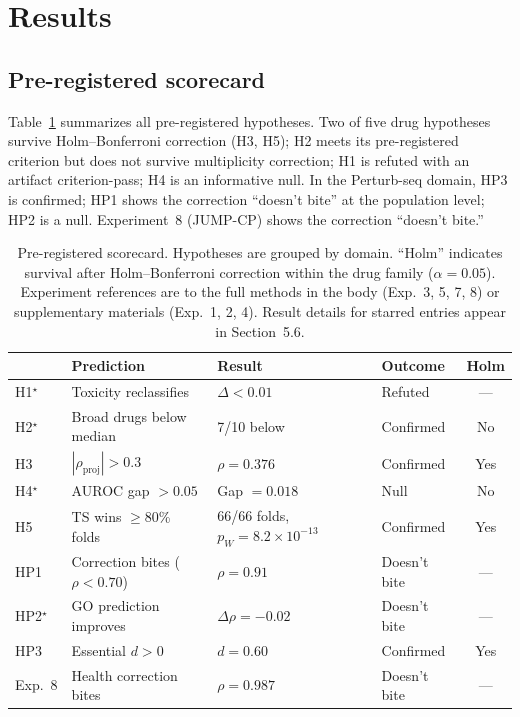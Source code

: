 \documentclass{article}
\begin{document}
\section{Results}

\subsection{Pre-registered scorecard}

Table~\ref{tab:scorecard} summarizes all pre-registered hypotheses.
Two of five drug hypotheses survive Holm--Bonferroni correction (H3, H5);
H2 meets its pre-registered criterion but does not survive multiplicity
correction; H1 is refuted with an artifact criterion-pass; H4 is an
informative null.
In the Perturb-seq domain, HP3 is confirmed; HP1 shows the correction
``doesn't bite'' at the population level; HP2 is a null. Experiment~8
(JUMP-CP) shows the correction ``doesn't bite.''

\begin{table}[t]
\centering
\caption{Pre-registered scorecard. Hypotheses are grouped by domain.
``Holm'' indicates survival after Holm--Bonferroni correction within
the drug family ($\alpha = 0.05$). Experiment references are to the
full methods in the body (Exp.~3, 5, 7, 8) or supplementary materials
(Exp.~1, 2, 4). Result details for starred entries appear in Section~5.6.}
\label{tab:scorecard}
\small
\begin{tabular}{llllc}
\toprule
 & Prediction & Result & Outcome & Holm \\
\midrule
H1$^\star$ & Toxicity reclassifies & $\Delta < 0.01$ & Refuted & --- \\
H2$^\star$ & Broad drugs below median & 7/10 below & Confirmed & No \\
H3 & $|\rho_{\text{proj}}| > 0.3$ & $\rho = 0.376$ & Confirmed & Yes \\
H4$^\star$ & AUROC gap $> 0.05$ & Gap $= 0.018$ & Null & No \\
H5 & TS wins $\geq$80\% folds & 66/66 folds, $p_W = 8.2 \times 10^{-13}$ & Confirmed & Yes \\
\midrule
HP1 & Correction bites ($\rho < 0.70$) & $\rho = 0.91$ & Doesn't bite & --- \\
HP2$^\star$ & GO prediction improves & $\Delta\rho = -0.02$ & Doesn't bite & --- \\
HP3 & Essential $d > 0$ & $d = 0.60$ & Confirmed & Yes \\
\midrule
Exp.~8 & Health correction bites & $\rho = 0.987$ & Doesn't bite & --- \\
\bottomrule
\end{tabular}
\end{table}
\end{document}
